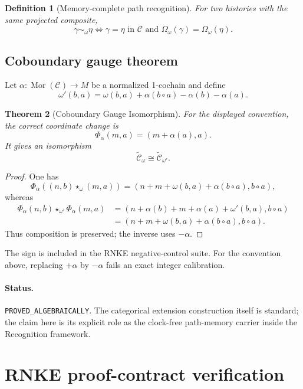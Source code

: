 \documentclass[11pt]{article}
\newtheorem{theorem}{Theorem}[section]
\newtheorem{definition}[theorem]{Definition}
\newcommand{\status}[1]{\texttt{#1}}
\begin{document}
\begin{definition}[Memory-complete path recognition]
For two histories with the same projected composite,
\[
\boxed{
\gamma\sim_\omega\eta
\iff
\gamma=\eta\text{ in }\mathcal C
\text{ and }
\Omega_\omega(\gamma)=\Omega_\omega(\eta).
}
\]
\end{definition}

\subsection{Coboundary gauge theorem}

Let \(\alpha:\operatorname{Mor}(\mathcal C)\to M\) be a normalized 1-cochain and define
\[
\omega'(b,a)
=
\omega(b,a)
+\alpha(b\circ a)-\alpha(b)-\alpha(a).
\]

\begin{theorem}[Coboundary Gauge Isomorphism]
For the displayed convention, the correct coordinate change is
\[
\boxed{
\Phi_\alpha(m,a)=(m+\alpha(a),a).
}
\]
It gives an isomorphism
\[
\widetilde{\mathcal C}_\omega
\cong
\widetilde{\mathcal C}_{\omega'}.
\]
\end{theorem}

\begin{proof}
One has
\[
\Phi_\alpha((n,b)\star_\omega(m,a))
=
(n+m+\omega(b,a)+\alpha(b\circ a),b\circ a),
\]
whereas
\begin{align*}
\Phi_\alpha(n,b)\star_{\omega'}\Phi_\alpha(m,a)
&=(n+\alpha(b)+m+\alpha(a)+\omega'(b,a),b\circ a)\\
&=(n+m+\omega(b,a)+\alpha(b\circ a),b\circ a).
\end{align*}
Thus composition is preserved; the inverse uses \(-\alpha\).
\end{proof}

The sign is included in the RNKE negative-control suite. For the convention above, replacing \(+\alpha\) by \(-\alpha\) fails an exact integer calibration.

\paragraph{Status.}
\status{PROVED\_ALGEBRAICALLY}. The categorical extension construction itself is standard; the claim here is its explicit role as the clock-free path-memory carrier inside the Recognition framework.

\section{RNKE proof-contract verification}
\end{document}
